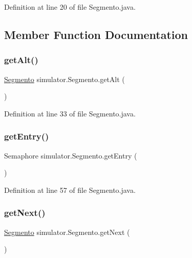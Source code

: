 Definition at line 20 of file Segmento.\+java.



\subsection{Member Function Documentation}
\mbox{\label{classsimulator_1_1_segmento_a431ce967de52a69163b325da75c785e2}} 
\subsubsection{\texorpdfstring{get\+Alt()}{getAlt()}}
{\footnotesize\ttfamily \mbox{\hyperlink{classsimulator_1_1_segmento}{Segmento}} simulator.\+Segmento.\+get\+Alt (\begin{DoxyParamCaption}{ }\end{DoxyParamCaption})}



Definition at line 33 of file Segmento.\+java.

\mbox{\label{classsimulator_1_1_segmento_a023207e6de068a9ebade1b88c477a756}} 
\subsubsection{\texorpdfstring{get\+Entry()}{getEntry()}}
{\footnotesize\ttfamily Semaphore simulator.\+Segmento.\+get\+Entry (\begin{DoxyParamCaption}{ }\end{DoxyParamCaption})}



Definition at line 57 of file Segmento.\+java.

\mbox{\label{classsimulator_1_1_segmento_a1a77a639c0f488b247294f4d57026dc3}} 
\subsubsection{\texorpdfstring{get\+Next()}{getNext()}}
{\footnotesize\ttfamily \mbox{\hyperlink{classsimulator_1_1_segmento}{Segmento}} simulator.\+Segmento.\+get\+Next (\begin{DoxyParamCaption}{ }\end{DoxyParamCaption})}



